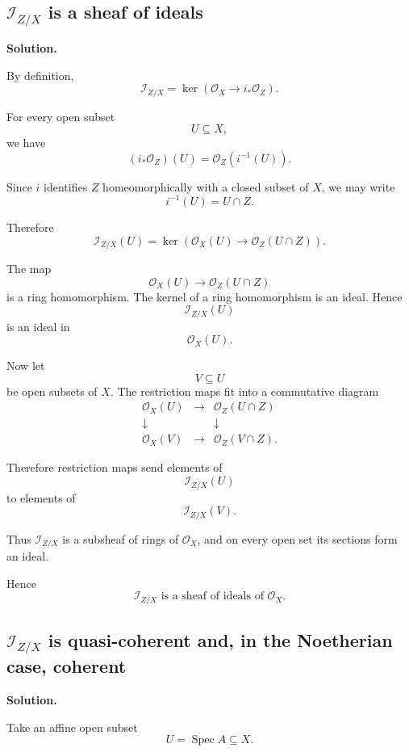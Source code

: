 \documentclass[12pt,a4paper]{article}
\DeclareMathOperator{\Spec}{Spec}
\newcommand{\OO}{\mathcal{O}}
\providecommand{\Spec}{\operatorname{Spec}}
\theoremstyle{notespace}
\begin{document}
\subsection{\texorpdfstring{\(\mathcal{I}_{Z/X}\)}{I Z/X} is a sheaf of ideals}

\textbf{Solution.}

By definition,
\[
\mathcal{I}_{Z/X}
=
\ker\!\left(
\OO_X\longrightarrow i_*\OO_Z
\right).
\]

For every open subset
\[
U\subseteq X,
\]
we have
\[
(i_*\OO_Z)(U)
=
\OO_Z(i^{-1}(U)).
\]

Since \(i\) identifies \(Z\) homeomorphically with a closed subset of \(X\), we may write
\[
i^{-1}(U)=U\cap Z.
\]

Therefore
\[
\mathcal{I}_{Z/X}(U)
=
\ker\!\left(
\OO_X(U)
\longrightarrow
\OO_Z(U\cap Z)
\right).
\]

The map
\[
\OO_X(U)\longrightarrow \OO_Z(U\cap Z)
\]
is a ring homomorphism. The kernel of a ring homomorphism is an ideal. Hence
\[
\mathcal{I}_{Z/X}(U)
\]
is an ideal in
\[
\OO_X(U).
\]

Now let
\[
V\subseteq U
\]
be open subsets of \(X\). The restriction maps fit into a commutative diagram
\[
\begin{array}{ccc}
	\OO_X(U) & \longrightarrow & \OO_Z(U\cap Z) \\[4pt]
	\downarrow & & \downarrow \\[4pt]
	\OO_X(V) & \longrightarrow & \OO_Z(V\cap Z).
\end{array}
\]

Therefore restriction maps send elements of
\[
\mathcal{I}_{Z/X}(U)
\]
to elements of
\[
\mathcal{I}_{Z/X}(V).
\]

Thus \(\mathcal{I}_{Z/X}\) is a subsheaf of rings of \(\OO_X\), and on every open set its sections form an ideal.

Hence
\[
\boxed{
	\mathcal{I}_{Z/X}
	\text{ is a sheaf of ideals of }\OO_X.
}
\]

\subsection{\texorpdfstring{\(\mathcal{I}_{Z/X}\)}{I Z/X} is quasi-coherent and, in the Noetherian case, coherent}

\textbf{Solution.}

Take an affine open subset
\[
U=\Spec A\subseteq X.
\]
\end{document}
